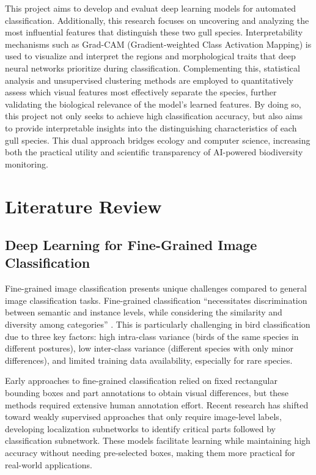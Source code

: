 \documentclass[a4paper,12pt]{report}
\begin{document}
This project aims to develop and evaluat deep learning models for automated classification. Additionally, this research focuses on uncovering and analyzing the most influential features that distinguish these two gull species. Interpretability mechanisms such as Grad-CAM (Gradient-weighted Class Activation Mapping) is used to visualize and interpret the regions and morphological traits that deep neural networks prioritize during classification. Complementing this, statistical analysis and unsupervised clustering methods are employed to quantitatively assess which visual features most effectively separate the species, further validating the biological relevance of the model's learned features. By doing so, this project not only seeks to achieve high classification accuracy, but also aims to provide interpretable insights into the distinguishing characteristics of each gull species. This dual approach bridges ecology and computer science, increasing both the practical utility and scientific transparency of AI-powered biodiversity monitoring.

\newpage
\chapter{Literature Review}
\section*{Deep Learning for Fine-Grained Image Classification}
Fine-grained image classification presents unique challenges compared to general image classification tasks. Fine-grained classification \enquote{necessitates discrimination between semantic and instance levels, while considering the similarity and diversity among categories} \citep{source2}. This is particularly challenging in bird classification due to three key factors: high intra-class variance (birds of the same species in different postures), low inter-class variance (different species with only minor differences), and limited training data availability, especially for rare species\citep{source2}.

Early approaches to fine-grained classification relied on fixed rectangular bounding boxes and part annotations to obtain visual differences, but these methods required extensive human annotation effort. Recent research has shifted toward weakly supervised approaches that only require image-level labels, developing localization subnetworks to identify critical parts followed by classification subnetwork. \citep{source2} These models facilitate learning while maintaining high accuracy without needing pre-selected boxes, making them more practical for real-world applications.
\end{document}
